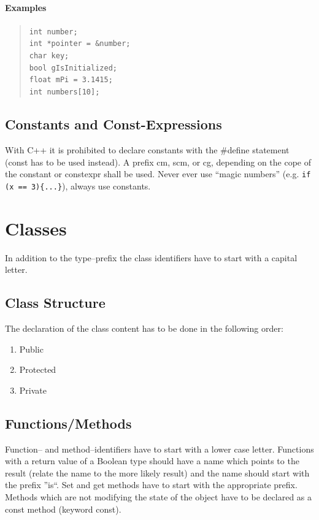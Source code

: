 \documentclass[final,a4paper,10pt, oneside]{article}
\begin{document}
\paragraph{Examples}
\begin{quote}
\verb|int number;|\\
\verb|int *pointer = &number;|\\
\verb|char key;|\\
\verb|bool gIsInitialized;|\\
\verb|float mPi = 3.1415;|\\
\verb|int numbers[10];|\\
\end{quote}


\subsection{Constants and Const-Expressions}
 With C++ it is prohibited to declare constants with the \#define statement (const has to be used instead). 
 A prefix cm, scm, or cg, depending on the cope of the constant or constexpr shall be used.
 Never ever use ``magic numbers'' (e.g. \verb|if (x == 3){...}|), always use constants.


\section{Classes}
In addition to the type--prefix the class identifiers have to start with a capital letter.
\subsection{Class Structure}
 The declaration of the class content has to be done in the following order:
\begin{enumerate}
\item Public
\item Protected
\item Private
\end{enumerate}

\subsection{Functions/Methods}
Function-- and method--identifiers have to start with a lower case letter. Functions with a return value of a Boolean type should have a name which points to the result (relate the name to the more likely result) and the name should start with the prefix ''is``. Set and get methods have to start with the appropriate prefix. Methods which are not modifying the state of the object have to be declared as a const method (keyword const).
\end{document}
